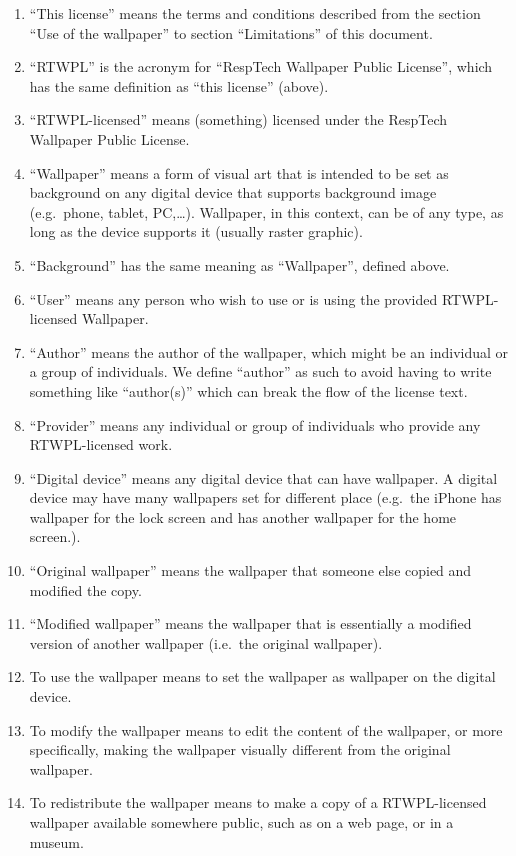 \documentclass[]{article}
\begin{document}
\begin{enumerate}
\def\labelenumi{\arabic{enumi}.}
\item
  ``This license'' means the terms and conditions described from the
  section ``Use of the wallpaper'' to section ``Limitations'' of this
  document.
\item
  ``RTWPL'' is the acronym for ``RespTech Wallpaper Public License'',
  which has the same definition as ``this license'' (above).
\item
  ``RTWPL-licensed'' means (something) licensed under the RespTech
  Wallpaper Public License.
\item
  ``Wallpaper'' means a form of visual art that is intended to be set as
  background on any digital device that supports background image
  (e.g.~phone, tablet, PC,\ldots{}). Wallpaper, in this context, can be
  of any type, as long as the device supports it (usually raster
  graphic).
\item
  ``Background'' has the same meaning as ``Wallpaper'', defined above.
\item
  ``User'' means any person who wish to use or is using the provided
  RTWPL-licensed Wallpaper.
\item
  ``Author'' means the author of the wallpaper, which might be an
  individual or a group of individuals. We define ``author'' as such to
  avoid having to write something like ``author(s)'' which can break the
  flow of the license text.
\item
  ``Provider'' means any individual or group of individuals who provide
  any RTWPL-licensed work.
\item
  ``Digital device'' means any digital device that can have wallpaper. A
  digital device may have many wallpapers set for different place
  (e.g.~the iPhone has wallpaper for the lock screen and has another
  wallpaper for the home screen.).
\item
  ``Original wallpaper'' means the wallpaper that someone else copied
  and modified the copy.
\item
  ``Modified wallpaper'' means the wallpaper that is essentially a
  modified version of another wallpaper (i.e.~the original wallpaper).
\item
  To use the wallpaper means to set the wallpaper as wallpaper on the
  digital device.
\item
  To modify the wallpaper means to edit the content of the wallpaper, or
  more specifically, making the wallpaper visually different from the
  original wallpaper.
\item
  To redistribute the wallpaper means to make a copy of a RTWPL-licensed
  wallpaper available somewhere public, such as on a web page, or in a
  museum.
\end{enumerate}
\end{document}
